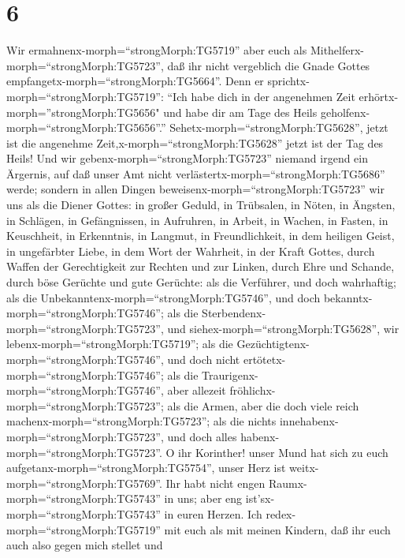 \hypertarget{section-5}{%
\section{6}\label{section-5}}

 Wir ermahnenx-morph=``strongMorph:TG5719'' aber euch als
Mithelferx-morph=``strongMorph:TG5723'', daß ihr nicht vergeblich die
Gnade Gottes empfangetx-morph=``strongMorph:TG5664''.  Denn
er sprichtx-morph=``strongMorph:TG5719'': ``Ich habe dich in der
angenehmen Zeit erhörtx-morph=''strongMorph:TG5656" und habe dir am Tage
des Heils geholfenx-morph=``strongMorph:TG5656''.''
Sehetx-morph=``strongMorph:TG5628'', jetzt ist die angenehme
Zeit,x-morph=``strongMorph:TG5628'' jetzt ist der Tag des Heils!
 Und wir gebenx-morph=``strongMorph:TG5723'' niemand irgend
ein Ärgernis, auf daß unser Amt nicht
verlästertx-morph=``strongMorph:TG5686'' werde;  sondern in
allen Dingen beweisenx-morph=``strongMorph:TG5723'' wir uns als die
Diener Gottes: in großer Geduld, in Trübsalen, in Nöten, in Ängsten,
 in Schlägen, in Gefängnissen, in Aufruhren, in Arbeit, in
Wachen, in Fasten,  in Keuschheit, in Erkenntnis, in
Langmut, in Freundlichkeit, in dem heiligen Geist, in ungefärbter Liebe,
 in dem Wort der Wahrheit, in der Kraft Gottes, durch Waffen
der Gerechtigkeit zur Rechten und zur Linken,  durch Ehre
und Schande, durch böse Gerüchte und gute Gerüchte: als die Verführer,
und doch wahrhaftig;  als die
Unbekanntenx-morph=``strongMorph:TG5746'', und doch
bekanntx-morph=``strongMorph:TG5746''; als die
Sterbendenx-morph=``strongMorph:TG5723'', und
siehex-morph=``strongMorph:TG5628'', wir
lebenx-morph=``strongMorph:TG5719''; als die
Gezüchtigtenx-morph=``strongMorph:TG5746'', und doch nicht
ertötetx-morph=``strongMorph:TG5746'';  als die
Traurigenx-morph=``strongMorph:TG5746'', aber allezeit
fröhlichx-morph=``strongMorph:TG5723''; als die Armen, aber die doch
viele reich machenx-morph=``strongMorph:TG5723''; als die nichts
innehabenx-morph=``strongMorph:TG5723'', und doch alles
habenx-morph=``strongMorph:TG5723''.  O ihr Korinther!
unser Mund hat sich zu euch aufgetanx-morph=``strongMorph:TG5754'',
unser Herz ist weitx-morph=``strongMorph:TG5769''.  Ihr
habt nicht engen Raumx-morph=``strongMorph:TG5743'' in uns; aber eng
ist'sx-morph=``strongMorph:TG5743'' in euren Herzen.  Ich
redex-morph=``strongMorph:TG5719'' mit euch als mit meinen Kindern, daß
ihr euch auch also gegen mich stellet und
